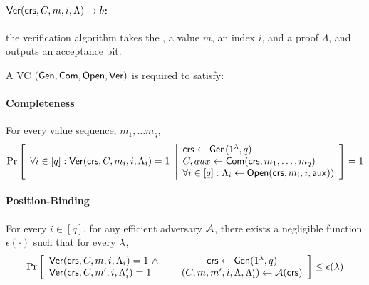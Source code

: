 \paragraph{$\mathsf{Ver}(\mathsf{crs}, C, m, i, \Lambda)\to b$:} the verification algorithm takes the \crs, a value $m$, an index $i$, and a proof $\Lambda$, and outputs an acceptance bit.
%

\begin{definition} \label{def:VC}
A VC $(\mathsf{Gen}, \mathsf{Com}, \mathsf{Open}, \mathsf{Ver})$ is required to satisfy:
\vspace{-1ex}
\paragraph{Completeness}

For every value sequence, $m_1,\ldots m_q$,
\begin{gather*}
    \underset{}{\text{Pr}}\left [
    \begin{array}{ll}
    \forall i\in [q]: 
         \mathsf{Ver}(\mathsf{crs}, C, m_i, i, \Lambda_i) = 1
    \end{array}
    \middle\vert
    \begin{array}{ll}
         \mathsf{crs} \leftarrow \mathsf{Gen}(1^\lambda, q)\\
         C, aux\leftarrow\mathsf{Com}(\mathsf{crs}, m_1,\ldots,m_q) \\
         \forall i\in [q]: \Lambda_i \leftarrow \mathsf{Open}(\mathsf{crs}, m_i, i, \mathsf{aux}))
    \end{array}
    \right ] = 1
\end{gather*}
\vspace{-3ex}
\paragraph{Position-Binding} For every $i\in [q]$, for any efficient adversary $\mathcal{A}$, there exists a negligible function $\epsilon(\cdot)$ such that for every $\lambda$, %
\begin{gather*}
    \underset{}{\text{Pr}}\left [
    \begin{array}{ll}
    \mathsf{Ver}(\mathsf{crs}, C, m, i, \Lambda_i) = 1 \ \wedge \\
    \mathsf{Ver}(\mathsf{crs}, C, m', i, \Lambda_i') = 1
    \end{array}
    \middle\vert
    \begin{array}{cc}
         &  \mathsf{crs} \leftarrow \mathsf{Gen}(1^\lambda, q)\\
         & (C, m, m', i, \Lambda, \Lambda_i')\leftarrow\mathcal{A}(\mathsf{crs})
    \end{array}
    \right ] \leq \epsilon(\lambda)
\end{gather*}


\end{definition}
